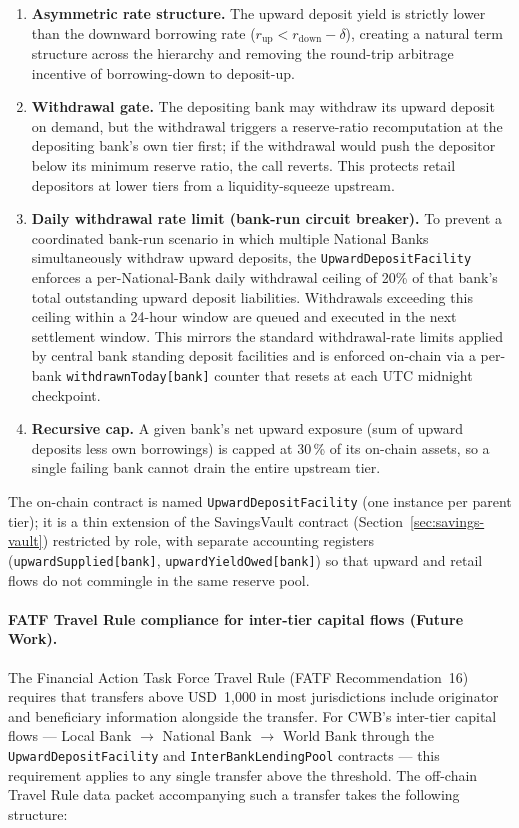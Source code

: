 \documentclass[12pt,a4paper]{report}
\begin{document}
\begin{enumerate}[noitemsep]
\item \textbf{Asymmetric rate structure.} The upward deposit yield is strictly lower than the downward borrowing rate ($r_{\text{up}} < r_{\text{down}} - \delta$), creating a natural term structure across the hierarchy and removing the round-trip arbitrage incentive of borrowing-down to deposit-up.
\item \textbf{Withdrawal gate.} The depositing bank may withdraw its upward deposit on demand, but the withdrawal triggers a reserve-ratio recomputation at the depositing bank's own tier first; if the withdrawal would push the depositor below its minimum reserve ratio, the call reverts. This protects retail depositors at lower tiers from a liquidity-squeeze upstream.
\item \textbf{Daily withdrawal rate limit (bank-run circuit breaker).} To prevent a coordinated bank-run scenario in which multiple National Banks simultaneously withdraw upward deposits, the \texttt{UpwardDepositFacility} enforces a per-National-Bank daily withdrawal ceiling of 20\% of that bank's total outstanding upward deposit liabilities. Withdrawals exceeding this ceiling within a 24-hour window are queued and executed in the next settlement window. This mirrors the standard withdrawal-rate limits applied by central bank standing deposit facilities and is enforced on-chain via a per-bank \texttt{withdrawnToday[bank]} counter that resets at each UTC midnight checkpoint.
\item \textbf{Recursive cap.} A given bank's net upward exposure (sum of upward deposits less own borrowings) is capped at 30\,\% of its on-chain assets, so a single failing bank cannot drain the entire upstream tier.
\end{enumerate}

The on-chain contract is named \texttt{UpwardDepositFacility} (one instance per parent tier); it is a thin extension of the SavingsVault contract (Section~\ref{sec:savings-vault}) restricted by role, with separate accounting registers (\texttt{upwardSupplied[bank]}, \texttt{upwardYieldOwed[bank]}) so that upward and retail flows do not commingle in the same reserve pool.

\paragraph{FATF Travel Rule compliance for inter-tier capital flows (Future Work).}
The Financial Action Task Force Travel Rule (FATF Recommendation~16) requires that transfers above USD~1,000 in most jurisdictions include originator and beneficiary information alongside the transfer. For CWB's inter-tier capital flows --- Local Bank $\to$ National Bank $\to$ World Bank through the \texttt{UpwardDepositFacility} and \texttt{InterBankLendingPool} contracts --- this requirement applies to any single transfer above the threshold. The off-chain Travel Rule data packet accompanying such a transfer takes the following structure:
\end{document}
